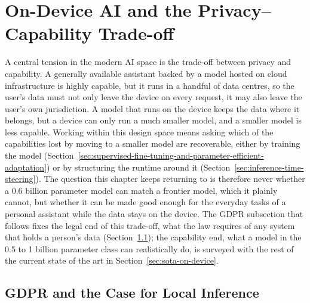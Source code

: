 \section{On-Device AI and the Privacy--Capability Trade-off}
\label{sec:on-device-ai-and-the-privacy-capability-trade-off}

A central tension in the modern AI space is the trade-off between privacy and capability. A generally available assistant backed by a model hosted on cloud infrastructure is highly capable, but it runs in a handful of data centres, so the user's data must not only leave the device on every request, it may also leave the user's own jurisdiction. A model that runs on the device keeps the data where it belongs, but a device can only run a much smaller model, and a smaller model is less capable. Working within this design space means asking which of the capabilities lost by moving to a smaller model are recoverable, either by training the model (Section~\ref{sec:supervised-fine-tuning-and-parameter-efficient-adaptation}) or by structuring the runtime around it (Section~\ref{sec:inference-time-steering}). The question this chapter keeps returning to is therefore never whether a 0.6 billion parameter model can match a frontier model, which it plainly cannot, but whether it can be made good enough for the everyday tasks of a personal assistant while the data stays on the device. The GDPR subsection that follows fixes the legal end of this trade-off, what the law requires of any system that holds a person's data (Section~\ref{subsec:gdpr-and-the-case-for-local-inference}); the capability end, what a model in the 0.5 to 1 billion parameter class can realistically do, is surveyed with the rest of the current state of the art in Section~\ref{sec:sota-on-device}.


\subsection{GDPR and the Case for Local Inference}
\label{subsec:gdpr-and-the-case-for-local-inference}


